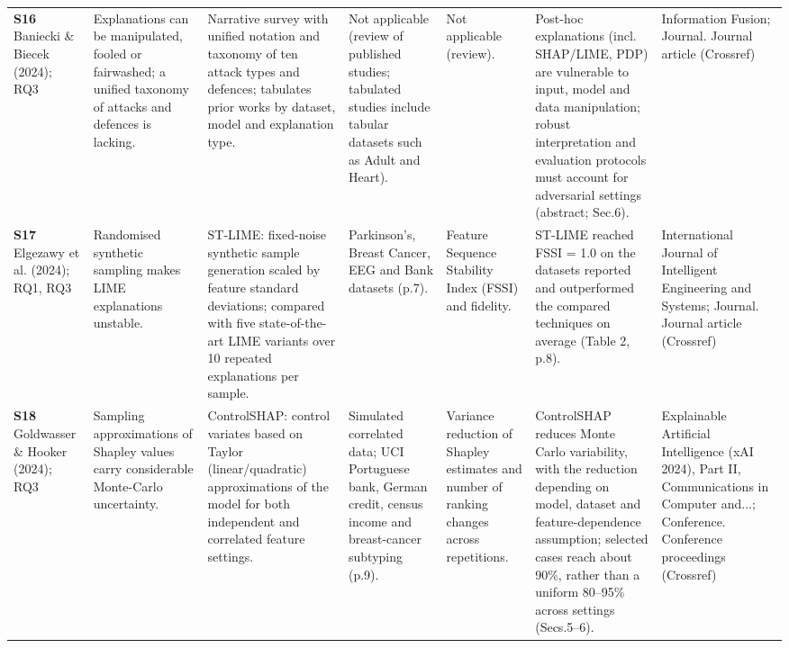 \begin{longtable}{@{}P{1.55cm}P{2.9cm}P{4.5cm}P{3.2cm}P{3.4cm}P{4.6cm}P{3.6cm}@{}}
\textbf{S16} \cite{S16} Baniecki \& Biecek (2024); RQ3 & Explanations can be manipulated, fooled or fairwashed; a unified taxonomy of attacks and defences is lacking. & Narrative survey with unified notation and taxonomy of ten attack types and defences; tabulates prior works by dataset, model and explanation type. & Not applicable (review of published studies; tabulated studies include tabular datasets such as Adult and Heart). & Not applicable (review). & Post-hoc explanations (incl. SHAP/\allowbreak{}LIME, PDP) are vulnerable to input, model and data manipulation; robust interpretation and evaluation protocols must account for adversarial settings (abstract; Sec.6). & Information Fusion; Journal. Journal article (Crossref) \\
\textbf{S17} \cite{S17} Elgezawy et al. (2024); RQ1, RQ3 & Randomised synthetic sampling makes LIME explanations unstable. & ST-LIME: fixed-noise synthetic sample generation scaled by feature standard deviations; compared with five state-of-the-art LIME variants over 10 repeated explanations per sample. & Parkinson's, Breast Cancer, EEG and Bank datasets (p.7). & Feature Sequence Stability Index (FSSI) and fidelity. & ST-LIME reached FSSI = 1.0 on the datasets reported and outperformed the compared techniques on average (Table 2, p.8). & International Journal of Intelligent Engineering and Systems; Journal. Journal article (Crossref) \\
\textbf{S18} \cite{S18} Goldwasser \& Hooker (2024); RQ3 & Sampling approximations of Shapley values carry considerable Monte-Carlo uncertainty. & ControlSHAP: control variates based on Taylor (linear/\allowbreak{}quadratic) approximations of the model for both independent and correlated feature settings. & Simulated correlated data; UCI Portuguese bank, German credit, census income and breast-cancer subtyping (p.9). & Variance reduction of Shapley estimates and number of ranking changes across repetitions. & ControlSHAP reduces Monte Carlo variability, with the reduction depending on model, dataset and feature-dependence assumption; selected cases reach about 90\%, rather than a uniform 80--95\% across settings (Secs.5--6). & Explainable Artificial Intelligence (xAI 2024), Part II, Communications in Computer and...; Conference. Conference proceedings (Crossref) \\

\end{longtable}
